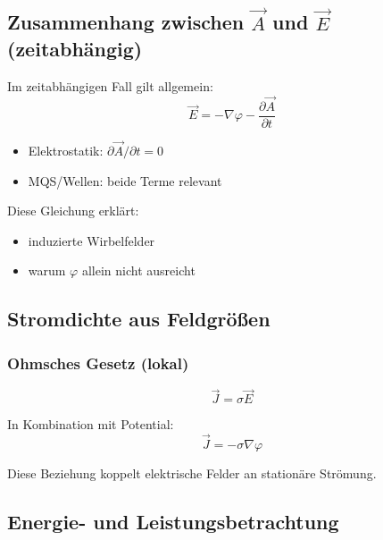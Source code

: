 \documentclass[a4paper]{article}
\newcommand{\E}{\vec E}
\newcommand{\J}{\vec J}
\newcommand{\A}{\vec A}
\begin{document}
\subsection{Zusammenhang zwischen $\A$ und $\E$ (zeitabhängig)}

Im zeitabhängigen Fall gilt allgemein:
\[
\E = -\nabla \varphi - \frac{\partial \A}{\partial t}
\]

\begin{merke}
\begin{itemize}
  \item Elektrostatik: $\partial \A/\partial t = 0$
  \item MQS/Wellen: beide Terme relevant
\end{itemize}
\end{merke}

Diese Gleichung erklärt:
\begin{itemize}
  \item induzierte Wirbelfelder
  \item warum $\varphi$ allein nicht ausreicht
\end{itemize}

\subsection{Stromdichte aus Feldgrößen}

\subsubsection{Ohmsches Gesetz (lokal)}

\[
\J = \sigma \E
\]

In Kombination mit Potential:
\[
\J = -\sigma \nabla \varphi
\]

\begin{schema}
Diese Beziehung koppelt elektrische Felder an stationäre Strömung.
\end{schema}

\subsection{Energie- und Leistungsbetrachtung}
\end{document}
